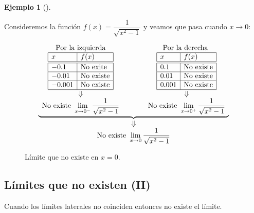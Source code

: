 \documentclass[
  a4paper,
]{scrreport}
\theoremstyle{plain}
\theoremstyle{definition}
\theoremstyle{plain}
\theoremstyle{plain}
\theoremstyle{definition}
\newtheorem{example}{Ejemplo}[chapter]
\theoremstyle{definition}
\theoremstyle{remark}
\begin{document}
\begin{example}[]\protect\hypertarget{exm-limites-no-existen}{}\label{exm-limites-no-existen}

Consideremos la función \(f(x)=\dfrac{1}{\sqrt{x^2-1}}\) y veamos que
pasa cuando \(x\to 0\):

\[
\begin{array}{c}
\underbrace{\begin{array}{ccc}
\mbox{Por la izquierda} & \qquad & \mbox{Por la derecha }\\
\begin{array}{|l|l|}
\hline
x      & f(x)   \\
\hline\hline
 -0.1   & \mbox{No exite}      \\
\hline
 -0.01   & \mbox{No existe}     \\
\hline
 -0.001  & \mbox{No existe}   \\
\hline
\end{array}
& &
\begin{array}{|l|l|}
\hline
x      & f(x)   \\
\hline\hline
 0.1    &  \mbox{No existe}      \\
\hline
 0.01   & \mbox{No existe}    \\
\hline
 0.001  & \mbox{No existe}   \\
\hline
\end{array}\\
\Downarrow & & \Downarrow\\
\displaystyle \mbox{No existe } \lim_{x\to 0^-}\frac{1}{\sqrt{x^2-1}}
& &
\displaystyle \mbox{No existe } \lim_{x\to 0^+}\frac{1}{\sqrt{x^2-1}}
\end{array}}\\
\Downarrow\\
\displaystyle \mbox{No existe }\lim_{x\to 0}\frac{1}{\sqrt{x^2-1}}
\end{array}\]

\begin{figure}
\centering

\caption{Límite que no existe en \(x=0\).}
\end{figure}

\end{example}

\subsection{Límites que no existen
(II)}\label{luxedmites-que-no-existen-ii}

Cuando los límites laterales no coinciden entonces no existe el límite.
\end{document}
